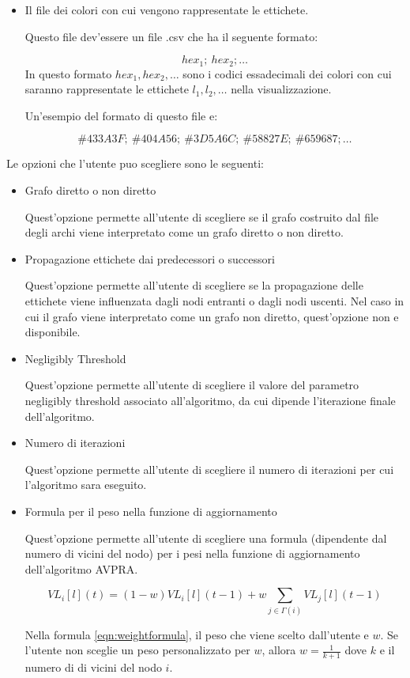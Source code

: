 \documentclass[a4paper,12pt]{report}
\begin{document}
\begin{itemize}
				\item Il file dei colori con cui vengono rappresentate le ettichete. 

				Questo file dev'essere un file .csv che ha il seguente formato: 

				\begin{equation}
				hex_1;\ hex_2; \dots
				\end{equation}
				In questo formato $hex_1, hex_2, \dots$ sono i codici essadecimali dei colori con cui saranno rappresentate le ettichete $l_1, l_2, \dots$ nella visualizzazione. 

				Un'esempio del formato di questo file e: 

				\begin{equation}
				\#433A3F;\ \#404A56;\ \#3D5A6C;\ \#58827E;\ \#659687; \dots
				\end{equation}
			\end{itemize}
			Le opzioni che l'utente puo scegliere sono le seguenti:
			\begin{itemize}
				\item Grafo diretto o non diretto 

				Quest'opzione permette all'utente di scegliere se il grafo costruito dal file degli archi viene interpretato come un grafo diretto o non diretto.

				\item Propagazione ettichete dai predecessori o successori 

				Quest'opzione permette all'utente di scegliere se la propagazione delle ettichete viene influenzata dagli nodi entranti o dagli nodi uscenti. Nel caso in cui il grafo viene interpretato come un grafo non diretto, quest'opzione non e disponibile.

				\item Negligibly Threshold 

				Quest'opzione permette all'utente di scegliere il valore del parametro negligibly threshold associato all'algoritmo, da cui dipende l'iterazione finale dell'algoritmo.

				\item Numero di iterazioni 

				Quest'opzione permette all'utente di scegliere il numero di iterazioni per cui l'algoritmo sara eseguito.

				\item Formula per il peso nella funzione di aggiornamento 

				Quest'opzione permette all'utente di scegliere una formula (dipendente dal numero di vicini del nodo) per i pesi nella funzione di aggiornamento dell'algoritmo AVPRA.


				\begin{equation}
				\label{eqn:weightformula}
				VL_i [l] (t) = (1-w) VL_i [l] (t-1) + w \sum_{j \in \Gamma(i)} VL_j [l](t-1)
				\end{equation}

				Nella formula \ref{eqn:weightformula}, il peso che viene scelto dall'utente e $w$. Se l'utente non sceglie un peso personalizzato per $w$, allora $w=\frac{1}{k+1}$ dove $k$ e il numero di di vicini del nodo $i$.

			\end{itemize}
\end{document}
